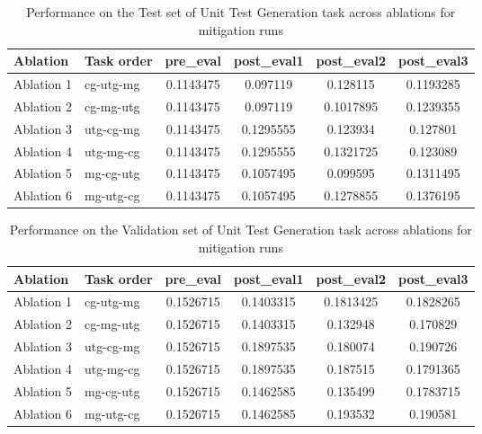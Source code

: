 \begin{table}[!ht]
    \centering
    \caption{Performance on the Test set of Unit Test Generation task across ablations for mitigation runs}
    \begin{tabular}{|l|l|S[table-format=2.4]|S[table-format=2.4]|S[table-format=2.4]|S[table-format=2.4]|}
    \hline
        \textbf{Ablation} & \textbf{Task order} & \textbf{pre\_eval} & \textbf{post\_eval1} & \textbf{post\_eval2} & \textbf{post\_eval3 } \\ \hline
        Ablation 1 & cg-utg-mg & 0.1143475 & 0.097119 & 0.128115 & 0.1193285  \\ 
        Ablation 2 & cg-mg-utg & 0.1143475 & 0.097119 & 0.1017895 & 0.1239355  \\ 
        Ablation 3 & utg-cg-mg & 0.1143475 & 0.1295555 & 0.123934 & 0.127801  \\ 
        Ablation 4 & utg-mg-cg & 0.1143475 & 0.1295555 & 0.1321725 & 0.123089  \\ 
        Ablation 5 & mg-cg-utg & 0.1143475 & 0.1057495 & 0.099595 & 0.1311495  \\ 
        Ablation 6 & mg-utg-cg & 0.1143475 & 0.1057495 & 0.1278855 & 0.1376195 \\ \hline
    \end{tabular}
    \label{tab:UnitTestGenTestMitigation}
\end{table}

\begin{table}[!ht]
    \centering
    \caption{Performance on the Validation set of Unit Test Generation task across ablations for mitigation runs}
    \begin{tabular}{|l|l|S[table-format=2.4]|S[table-format=2.4]|S[table-format=2.4]|S[table-format=2.4]|}
    \hline
        \textbf{Ablation} & \textbf{Task order} & \textbf{pre\_eval} & \textbf{post\_eval1} & \textbf{post\_eval2} & \textbf{post\_eval3 } \\ \hline
        Ablation 1 & cg-utg-mg & 0.1526715 & 0.1403315 & 0.1813425 & 0.1828265  \\ 
        Ablation 2 & cg-mg-utg & 0.1526715 & 0.1403315 & 0.132948 & 0.170829  \\ 
        Ablation 3 & utg-cg-mg & 0.1526715 & 0.1897535 & 0.180074 & 0.190726  \\ 
        Ablation 4 & utg-mg-cg & 0.1526715 & 0.1897535 & 0.187515 & 0.1791365  \\ 
        Ablation 5 & mg-cg-utg & 0.1526715 & 0.1462585 & 0.135499 & 0.1783715  \\ 
        Ablation 6 & mg-utg-cg & 0.1526715 & 0.1462585 & 0.193532 & 0.190581 \\ \hline
    \end{tabular}
    \label{tab:UnitTestGenValMitigation}
\end{table}

